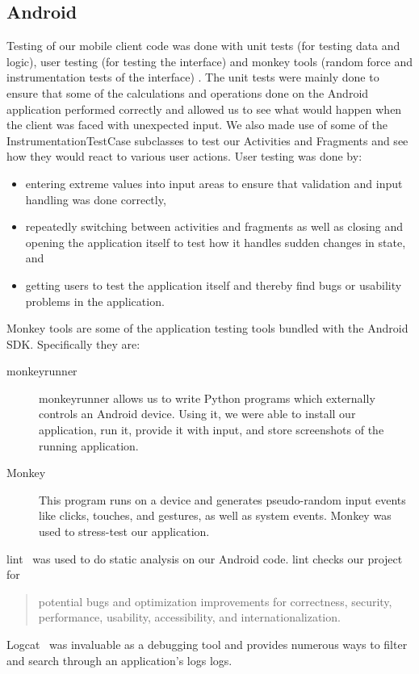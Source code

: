 \subsection{Android}
Testing of our mobile client code was done with unit tests (for testing data and
logic), user testing (for testing the interface) and monkey tools (random
force and instrumentation tests of the interface) .
The unit tests were mainly done to ensure that some of the calculations and
operations done on the Android application performed correctly and allowed
us to see what would happen when the client was faced with unexpected input. We
also made use of some of the InstrumentationTestCase subclasses to test our
Activities and Fragments and see how they would react to various user actions.
User testing was done by:
\begin{itemize}
\item entering extreme values into input areas to ensure that validation and
  input handling was done correctly,
\item repeatedly switching between activities and fragments as well as closing
and opening the application itself to test how it handles sudden
changes in state, and
\item getting users to test the application itself and thereby find bugs or
usability problems in the application.
\end{itemize} 
Monkey tools are some of the application testing tools bundled with the Android
SDK. Specifically they are:
\begin{description}
  \item[monkeyrunner~\cite{runner}] monkeyrunner allows us to write Python
  programs which externally controls an Android device. Using it, we were able
  to install our application, run it, provide it with input, and store
  screenshots of the running application.
\item[Monkey~\cite{monkey}] This program runs on a device and generates
pseudo-random input events like clicks, touches, and gestures, as well as
 system events. Monkey was used to stress-test our application.
\end{description}
lint~\cite{lint} was used to do static analysis on our Android code. lint checks
our project for
\begin{quote}
potential bugs and optimization improvements for correctness,
security, performance, usability, accessibility, and
internationalization.~\cite{lint}
\end{quote} 
Logcat~\cite{logcat} was invaluable as a debugging tool and provides numerous
ways to filter and search through an application's logs logs.

